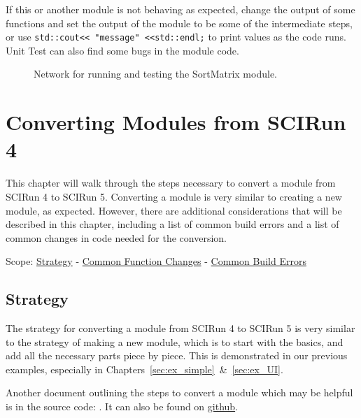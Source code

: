 \documentclass[fleqn,11pt,openany]{book}
\begin{document}
If this or another module is not behaving as expected, change the output of some functions and set the output of the module to be some of the intermediate steps, or use \verb|std::cout<< "message" <<std::endl;| to print values as the code runs.  
Unit Test can also find some bugs in the module code.  


\begin{figure}[H]
\centerline{}
\caption{Network for running and testing the SortMatrix module.}
\label{fig:Testalg_net}
\end{figure}



\chapter{Converting Modules from SCIRun 4}
\label{sec:converting}

\begin{introduction}
This chapter will walk through the steps necessary to convert a module from SCIRun 4 to SCIRun 5.  
Converting a module is very similar to creating a new module, as expected.  
However, there are additional considerations that will be described in this chapter, including a list of common build errors and a list of common changes in code needed for the conversion.

Scope: \hyperref[sec:strategy]{Strategy} - \hyperref[sec:changes]{Common Function Changes} - \hyperref[sec:errors]{Common Build Errors}
\end{introduction}

\section{Strategy}
\label{sec:strategy}

The strategy for converting a module from SCIRun 4 to SCIRun 5 is very similar to the strategy of making a new module, which is to start with the basics, and add all the necessary parts piece by piece.  
This is demonstrated in our previous examples, especially in Chapters~\ref{sec:ex_simple}~\&~\ref{sec:ex_UI}.

Another document outlining the steps to convert a module which may be helpful is in the source code: \emph{}.
It can also be found on \href{https://github.com/SCIInstitute/SCIRun/blob/master/src/Documentation/Manuals/ModuleConversionSteps.md}{github}.
\end{document}
